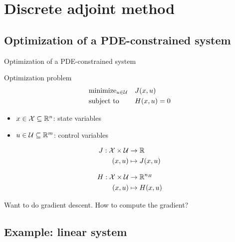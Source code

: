 \section{Discrete adjoint method}

\subsection{Optimization of a PDE-constrained system}


\begin{frame}{Optimization of a PDE-constrained system}

\begin{block}{Optimization problem}
\[
\begin{aligned}
&\text{minimize}_{u \in \mathcal{U}} && J(x,u) \\
&\text{subject to} &&H(x,u) = 0
\end{aligned}
\]
\end{block}

\begin{itemize}
\item $x \in \mathcal{X} \subseteq \mathbb{R}^n$: state variables
\item $u \in \mathcal{U}  \subseteq \mathbb{R}^m$: control variables
\end{itemize}


\[
\begin{aligned}
J: \mathcal{X} \times \mathcal{U} & \rightarrow \mathbb{R}\\
(x,u) & \mapsto J(x,u)
\end{aligned}
\]

\[
\begin{aligned}
H: \mathcal{X} \times \mathcal{U} & \rightarrow \mathbb{R}^{n_H}\\
(x,u) & \mapsto H(x,u)
\end{aligned}
\]

Want to do gradient descent. How to compute the gradient?
\end{frame}


\subsection{Example: linear system}

